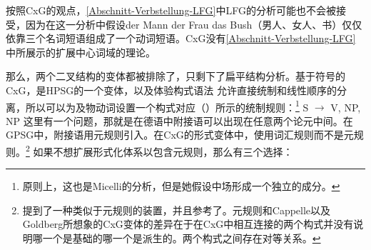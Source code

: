 按照CxG的观点，\ref{Abschnitt-Verbstellung-LFG}中LFG的分析可能也不会被接受，因为在这一分析中假设der Mann der Frau das Bush（男人、女人、书）仅仅依靠三个名词短语组成了一个动词短语。CxG没有\ref{Abschnitt-Verbstellung-LFG}中所展示的扩展中心词域的理论。

那么，两个二叉结构的变体都被排除了，只剩下了扁平结构分析。基于符号的CxG，是HPSG的一个变体\citep[]{Sag2010b}，以及体验构式语法 \citep[]{BC2005a}允许直接统制和线性顺序的分离，所以可以为及物动词设置一个构式对应（）所示的统制规则：\footnote{%
	原则上，这也是Micelli的分析，但是她假设中场形成一个独立的成分。%
}
\ea
S $\to$ V, NP, NP
\z
这里有一个问题，那就是在德语中附接语可以出现在任意两个论元中间。在GPSG中，附接语用元规则引入。在CxG的形式变体中，使用词汇规则而不是元规则。\footnote{\label{fn-allostructions}%
  \citet[]{Goldberg2014a}提到了一种类似于元规则的装置，并且参考了。元规则和Cappelle以及Goldberg所想象的CxG变体的差异在于在CxG中相互连接的两个构式并没有说明哪一个是基础的哪一个是派生的。两个构式之间存在对等关系。%
} 如果不想扩展形式化体系以包含元规则，那么有三个选择：
